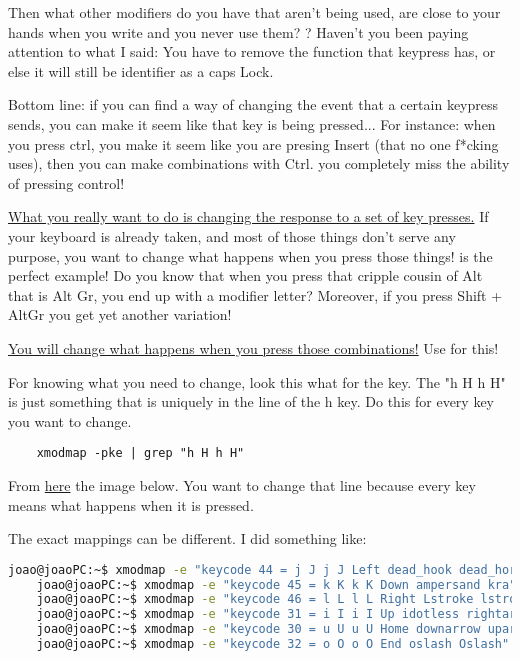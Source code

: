 \par Then what other modifiers do you have that aren't being used, are close to your hands when you write and you never use them? ? Haven't you been paying attention to what I said: You have to remove the function that keypress has, or else it will still be identifier as a caps Lock.

\par Bottom line: if you can find a way of changing the event that a certain keypress sends, you can make it seem like that key is being pressed... For instance: when you press ctrl, you make it seem like you are presing Insert (that no one f*cking uses), then you can make combinations with Ctrl.  you completely miss the ability of pressing control!

\par \uline{What you really want to do is changing the response to a set of key presses.} If your keyboard is already taken, and most of those things don't serve any purpose, you want to change what happens when you press those things!  is the perfect example! Do you know that when you press that cripple cousin of Alt that is Alt Gr, you end up with a modifier letter? Moreover, if you press Shift + AltGr you get yet another variation! 

\par \ul{You will change what happens when you press those combinations!} Use  for this!

\vspace{.5cm}
For knowing what you need to change, look this what for the key. The "h H h H" is just something that is uniquely in the line of the h key. Do this for every key you want to change.
\begin{lstlisting}
    xmodmap -pke | grep "h H h H"  
\end{lstlisting}

\vspace{.5cm}
From \href{https://askubuntu.com/questions/1025765/how-to-map-alt-hjkl-keys-to-arrow-keys}{here} the image below. You want to change that line because every key means what happens when it is pressed.


\par The exact mappings can be different. I did something like:

\begin{lstlisting}[language=bash, numbers=none]
    joao@joaoPC:~$ xmodmap -e "keycode 44 = j J j J Left dead_hook dead_horn"
    joao@joaoPC:~$ xmodmap -e "keycode 45 = k K k K Down ampersand kra"
    joao@joaoPC:~$ xmodmap -e "keycode 46 = l L l L Right Lstroke lstroke"
    joao@joaoPC:~$ xmodmap -e "keycode 31 = i I i I Up idotless rightarrow"
    joao@joaoPC:~$ xmodmap -e "keycode 30 = u U u U Home downarrow uparrow"
    joao@joaoPC:~$ xmodmap -e "keycode 32 = o O o O End oslash Oslash"
\end{lstlisting}

